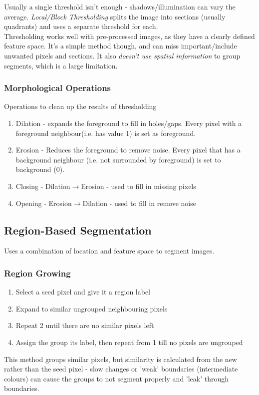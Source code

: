 Usually a single threshold isn't enough - shadows/illumination can vary the average. \emph{Local/Block Thresholding} splits the image into sections (usually quadrants) and uses a separate threshold for each. \\

Thresholding works well with pre-processed images, as they have a clearly defined feature space. It's a simple method though, and can miss important/include unwanted pixels and sections. It also \emph{doesn't use spatial information} to group segments, which is a large limitation.

\subsubsection{Morphological Operations}
Operations to clean up the results of thresholding 
\begin{enumerate}
    \item Dilation - expands the foreground to fill in holes/gaps. Every pixel with a foreground neighbour(i.e. has value 1) is set as foreground.
    \item Erosion - Reduces the foreground to remove noise. Every pixel that has a background neighbour (i.e. not surrounded by foreground) is set to background (0).
    \item Closing - Dilation$\rightarrow$Erosion - used to fill in missing pixels
    \item Opening - Erosion$\rightarrow$Dilation - used to fill in remove noise
\end{enumerate}

\subsection{Region-Based Segmentation}
Uses a combination of location and feature space to segment images.

\subsubsection{Region Growing}
\begin{enumerate}
    \item Select a seed pixel and give it a region label
    \item Expand to similar ungrouped neighbouring pixels
    \item Repeat 2 until there are no similar pixels left
    \item Assign the group its label, then repeat from 1 till no pixels are ungrouped
\end{enumerate}
This method groups similar pixels, but similarity is calculated from the new rather than the seed pixel - slow changes or 'weak' boundaries (intermediate colours) can cause the groups to not segment properly and 'leak' through boundaries. 


